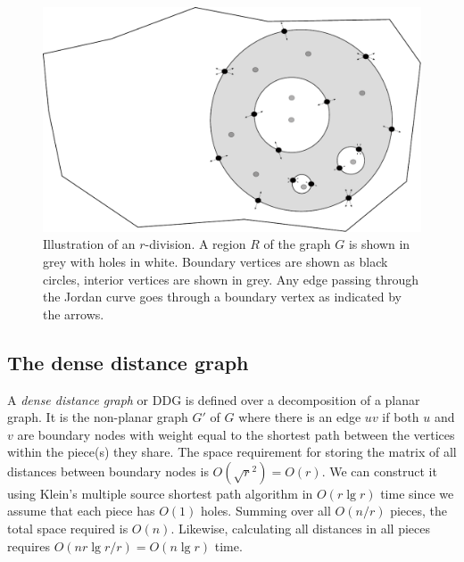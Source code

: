 \begin{figure}[h!]
  \includegraphics[width=1.0\textwidth]{figs/rdiv.pdf}
  \caption{Illustration of an $r$-division. A region $R$ of the graph $G$ is shown in
  grey with holes in white. Boundary vertices are shown as black circles, interior vertices are shown in
grey. Any edge passing through the Jordan curve goes through a boundary vertex as
indicated by the arrows.}
    \label{rdiv}
\end{figure}

\subsection{The dense distance graph}
A \textit{dense distance graph} or DDG is defined over a decomposition of a planar
graph. It is the non-planar graph $G'$ of $G$ where there is an edge $uv$ if both $u$ and
$v$ are boundary nodes with weight equal to the shortest path between the vertices within
the piece(s) they share. The space requirement for storing the matrix of all distances between boundary
nodes is $O(\sqrt{r}^2)=O(r)$. We can construct it using Klein's multiple source shortest
path algorithm in $O(r\lg r)$ time since we assume that each piece has $O(1)$ holes.
Summing over all $O(n/r)$ pieces, the total space required is $O(n)$. Likewise, calculating all
distances in all pieces requires $O(nr\lg r/r)=O(n\lg r)$ time.

